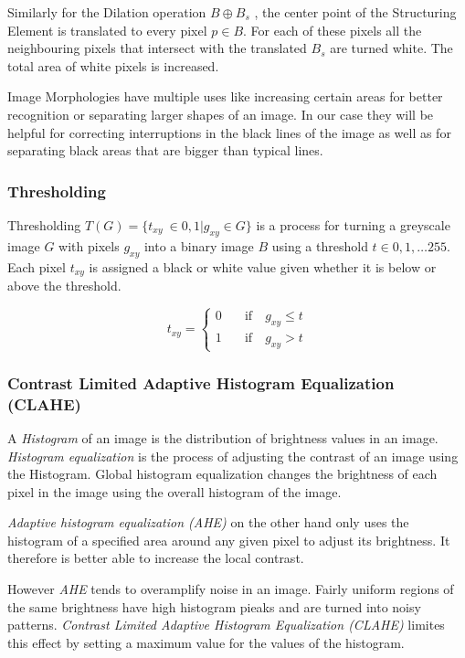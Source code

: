 \documentclass[serif,article,noparskip]{agse-thesis}
\begin{document}
Similarly for the Dilation operation  $B \oplus B_s$ , the center point of the
Structuring Element is translated to every pixel $p \in B$. For each of these
pixels all the neighbouring pixels that intersect with the translated $B_s$ are
turned white. The total area of white pixels is increased. \cite{Smith1997}

Image Morphologies have multiple uses like increasing certain areas for better
recognition or separating larger shapes of an image. In our case they will be
helpful for correcting interruptions in the black lines of the image as well as
for separating black areas that are bigger than typical lines.

\subsubsection{Thresholding}

Thresholding $T(G) = \{t_{xy}\ \in {0,1} | g_{xy} \in G\}$ is a process for turning a greyscale image $G$
with pixels $g_{xy}$ into a binary image $B$ using a threshold $t \in
0,1,\dots255$. Each pixel $t_{xy}$ is assigned a black or white value given
whether it is below or above the threshold.

\begin{equation}
  t_{xy} =
  \begin{cases}
    0 & \quad  \text{if}  \quad g_{xy} \leq t\\
    1  & \quad \text{if}  \quad g_{xy} > t
  \end{cases}
\end{equation}

\subsubsection{Contrast Limited Adaptive Histogram
Equalization (CLAHE)}

A \textit{Histogram} of an image is the distribution of brightness values in an
image. \textit{Histogram equalization} is the process of adjusting the contrast
of an image using the Histogram. Global histogram equalization changes the
brightness of each pixel in the image using the overall histogram of the image.
\cite{ShapiroLindaG2001Cv}

\textit{Adaptive histogram equalization (AHE)} on the other hand only uses the
histogram of a specified area around any given pixel to adjust its brightness.
It therefore is better able to increase the local contrast.

However \textit{AHE} tends to overamplify noise in an image. Fairly uniform
regions of the same brightness have high histogram pieaks and are turned into
noisy patterns.  \textit{Contrast Limited Adaptive Histogram Equalization
(CLAHE)} limites this effect by setting a maximum value for the values of the
histogram. \cite{Pizer1987}
\end{document}
